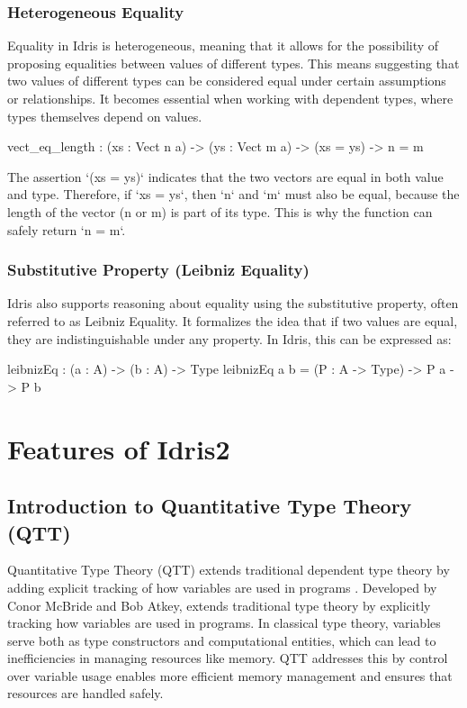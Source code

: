 \documentclass[]{rptuseminar}
\begin{document}
\subsubsection{Heterogeneous Equality}
Equality in Idris is heterogeneous, meaning that it allows for the possibility of proposing equalities between values of different types. This means suggesting that two values of different types can be considered equal under certain assumptions or relationships. It becomes essential when working with dependent types, where types themselves depend on values.

\begin{idris}
vect_eq_length : (xs : Vect n a) -> (ys : Vect m a) ->
(xs = ys) -> n = m 
\end{idris}

The assertion `(xs = ys)` indicates that the two vectors are equal in both value and type. Therefore, if `xs = ys`, then `n` and `m` must also be equal, because the length of the vector (n or m) is part of its type. This is why the function can safely return `n = m`.

\subsubsection{Substitutive Property (Leibniz Equality)}
Idris also supports reasoning about equality using the substitutive property, often referred to as Leibniz Equality. It formalizes the idea that if two values are equal, they are indistinguishable under any property. In Idris, this can be expressed as:

\begin{idris}
leibnizEq : (a : A) -> (b : A) -> Type
leibnizEq a b = (P : A -> Type) -> P a -> P b
\end{idris}
\section{Features of Idris2}  
\label{sec:features}

\subsection{Introduction to Quantitative Type Theory (QTT)}
\label{sec:qtt}
Quantitative Type Theory (QTT) extends traditional dependent type theory by adding explicit tracking of how variables are used in programs \cite{atkey2018syntax}. Developed by Conor McBride and Bob Atkey, extends traditional type theory by explicitly tracking how variables are used in programs. In classical type theory, variables serve both as type constructors and computational entities, which can lead to inefficiencies in managing resources like memory. QTT addresses this by control over variable usage enables more efficient memory management and ensures that resources are handled safely.
\end{document}
